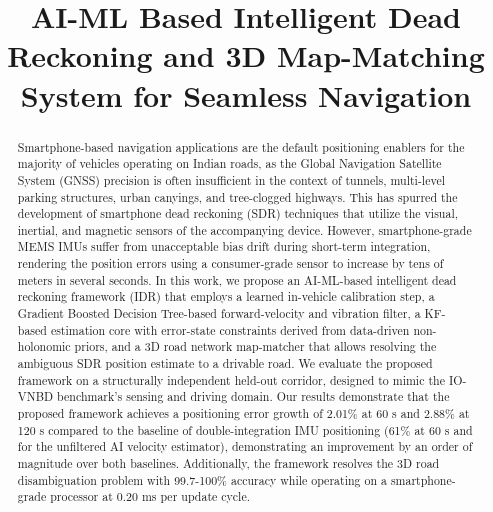 \documentclass[conference]{IEEEtran}
\begin{document}
\title{AI-ML Based Intelligent Dead Reckoning and 3D Map-Matching System for Seamless Navigation}

\author{
\and
{}
\and
{}
}

\maketitle

\begin{abstract}
Smartphone-based navigation applications are the default positioning enablers for the majority of vehicles operating on Indian roads, as the Global Navigation Satellite System (GNSS) precision is often insufficient in the context of tunnels, multi-level parking structures, urban canyings, and tree-clogged highways. This has spurred the development of smartphone dead reckoning (SDR) techniques that utilize the visual, inertial, and magnetic sensors of the accompanying device. However, smartphone-grade MEMS IMUs suffer from unacceptable bias drift during short-term integration, rendering the position errors using a consumer-grade sensor to increase by tens of meters in several seconds. In this work, we propose an AI-ML-based intelligent dead reckoning framework (IDR) that employs a learned in-vehicle calibration step, a Gradient Boosted Decision Tree-based forward-velocity and vibration filter, a KF-based estimation core with error-state constraints derived from data-driven non-holonomic priors, and a 3D road network map-matcher that allows resolving the ambiguous SDR position estimate to a drivable road. We evaluate the proposed framework on a structurally independent held-out corridor, designed to mimic the IO-VNBD benchmark's sensing and driving domain. Our results demonstrate that the proposed framework achieves a positioning error growth of 2.01\% at 60 s and 2.88\% at 120 s compared to the baseline of double-integration IMU positioning (61\% at 60 s and for the unfiltered AI velocity estimator), demonstrating an improvement by an order of magnitude over both baselines. Additionally, the framework resolves the 3D road disambiguation problem with 99.7-100\% accuracy while operating on a smartphone-grade processor at 0.20 ms per update cycle.
\end{abstract}
\end{document}
